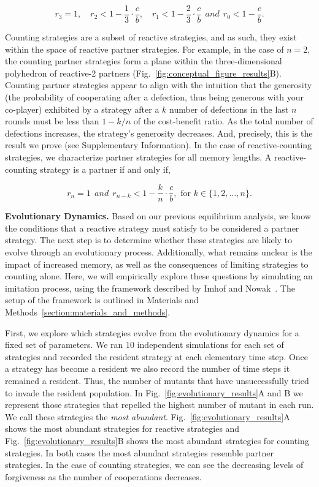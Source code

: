 \documentclass[11pt]{article}
\begin{document}
\begin{equation}\label{eq:counting_three_bit_conditions}
  r_3 = 1, \quad \displaystyle r_2 < 1- \frac{1}{3} \cdot \frac{c}{b}, \quad r_1 < 1- \frac{2}{3} \cdot \frac{c}{b} ~~and~~ r_0 < 1\!-\! \frac{c}{b}.
\end{equation}

Counting strategies are a subset of reactive strategies, and as such, they exist
within the space of reactive partner strategies. For example, in the case of
$n=2$, the counting partner strategies form a plane within the three-dimensional
polyhedron of reactive-2 partners (Fig.~\ref{fig:conceptual_figure_results}B).
Counting partner strategies appear to align with the intuition that the
generosity (the probability of cooperating after a defection, thus being
generous with your co-player) exhibited by a strategy after a $k$ number of
defections in the last $n$ rounds must be less than $1 - k/n$ of the
cost-benefit ratio. As the total number of defections increases, the strategy's
generosity decreases. And, precisely, this is the result we prove (see
Supplementary Information). In the case of reactive-counting strategies, we
characterize partner strategies for all memory lengths. A reactive-counting
strategy is a partner if and only if,

\begin{equation}
  r_n = 1 ~~and~~ r_{n - k} < 1 - \frac{k}{n} \cdot \frac{c}{b}, \text{ for } k \in \{1, 2, \dots, n\}.
\end{equation}


\textbf{Evolutionary Dynamics.}
Based on our previous equilibrium analysis, we know the conditions that a
reactive strategy must satisfy to be considered a partner strategy. The next
step is to determine whether these strategies are likely to evolve through an
evolutionary process. Additionally, what remains unclear is the impact of
increased memory, as well as the consequences of limiting strategies to counting
alone. Here, we will empirically explore these questions by simulating an
imitation process, using the framework described by Imhof and
Nowak~\cite{imhof:royal:2010}. The setup of the framework is outlined in
Materials and Methods~\ref{section:materials_and_methods}.

First, we explore which strategies evolve from the evolutionary dynamics for a
fixed set of parameters. We ran 10 independent simulations for each set of
strategies and recorded the resident strategy at each elementary time step. Once
a strategy has become a resident we also record the number of time steps it
remained a resident. Thus, the number of mutants that have unsuccessfully tried
to invade the resident population. In Fig.~\ref{fig:evolutionary_results}A and B
we represent those strategies that repelled the highest number of mutant in each
run. We call these strategies the {\it most abundant}.
Fig.~\ref{fig:evolutionary_results}A shows the most abundant strategies for
reactive strategies and Fig.~\ref{fig:evolutionary_results}B shows the most
abundant strategies for counting strategies. In both cases the most abundant
strategies resemble partner strategies. In the case of counting strategies, we
can see the decreasing levels of forgiveness as the number of cooperations
decreases.
\end{document}
